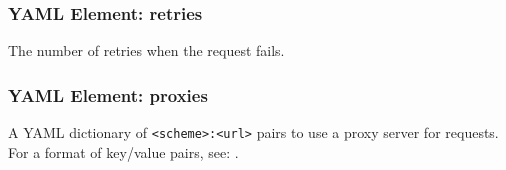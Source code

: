 \subsubsection{YAML Element: retries}\label{sec:yaml-generic-retries}
The number of retries when the request fails.


\subsubsection{YAML Element: proxies}\label{sec:yaml-generic-proxies}
A YAML dictionary of \texttt{<scheme>:<url>} pairs to use a proxy server for requests. 
For a format of key/value pairs, see: .


